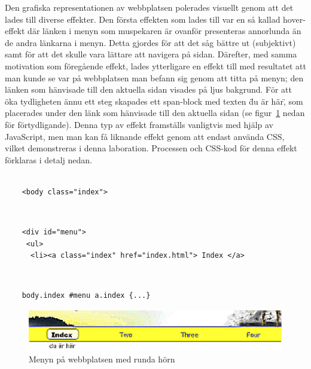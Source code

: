 \documentclass[a4paper,10pt]{article}
\begin{document}
Den grafiska representationen av webbplatsen polerades visuellt genom att det lades till diverse effekter. Den första effekten som lades till var en så kallad hover-effekt där länken i menyn som muspekaren är ovanför presenteras annorlunda än de andra länkarna i menyn. Detta gjordes för att det såg bättre ut (subjektivt) samt för att det skulle vara lättare att navigera på sidan. Därefter, med samma motivation som föregående effekt, lades ytterligare en effekt till med resultatet att man kunde se var på webbplatsen man befann sig genom att titta på menyn; den länken som hänvisade till den aktuella sidan visades på ljus bakgrund. För att öka tydligheten ännu ett steg skapades ett span-block med texten \"du är här\", som placerades under den länk som hänvisade till den aktuella sidan (se figur~\ref{meny} nedan för förtydligande). Denna typ av effekt framställs vanligtvis med hjälp av JavaScript, men man kan få liknande effekt genom att endast använda CSS, vilket demonstreras i denna laboration. Processen och CSS-kod för denna effekt förklaras i detalj nedan. \\
\\
\begin{verbatim}
    <body class="index">
\end{verbatim} 
\\
\begin{verbatim}
    <div id="menu">
     <ul>
      <li><a class="index" href="index.html"> Index </a>
\end{verbatim} 
\\
\begin{verbatim}
    body.index #menu a.index {...}
\end{verbatim}

\begin{figure}[h]
 \begin{center}
  \includegraphics{menu.eps}
 \end{center}
 \caption{Menyn på webbplatsen med runda hörn}
 \label{meny}
\end{figure}
\end{document}
